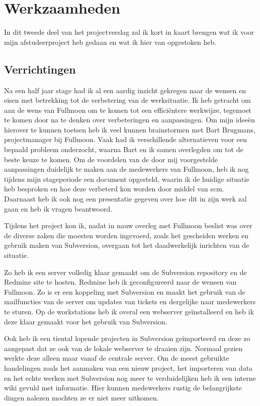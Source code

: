 \chapter{Werkzaamheden}

In dit tweede deel van het projectverslag zal ik kort in kaart brengen wat ik voor mijn afstudeerproject heb gedaan en wat ik hier van opgestoken heb.

\section{Verrichtingen}

Na een half jaar stage had ik al een aardig inzicht gekregen naar de wensen en eisen met betrekking tot de verbetering van de werksituatie. Ik heb getracht om aan de wens van Fullmoon om te komen tot een efficiëntere werkwijze, tegemoet te komen door na te denken over verbeteringen en aanpassingen. Om mijn ideeën hierover te kunnen toetsen heb ik veel kunnen brainstormen met Bart Brugmans, projectmanager bij Fullmoon. Vaak had ik verschillende alternatieven voor een bepaald probleem onderzocht, waarna Bart en ik samen overlegden om tot de beste keuze te komen. Om de voordelen van de door mij voorgestelde aanpassingen duidelijk te maken aan de medewerkers van Fullmoon, heb ik nog tijdens mijn stageperiode een document opgesteld, waarin ik de huidige situatie heb besproken en hoe deze verbeterd kon worden door middel van {\sc scm}. Daarnaast heb ik ook nog een presentatie gegeven over hoe dit in zijn werk zal gaan en heb ik vragen beantwoord. 

Tijdens het project kon ik, nadat in nauw overleg met Fullmoon beslist was over de diverse zaken die moesten worden ingevoerd, zoals het gescheiden werken en gebruik maken van Subversion, overgaan tot het daadwerkelijk inrichten van de situatie.

Zo heb ik een server volledig klaar gemaakt om de Subversion repository en de Redmine site te hosten. Redmine heb ik geconfigureerd naar de wensen van Fullmoon. Zo is er een koppeling met Subversion en maakt het gebruik van de mailfuncties van de server om updates van tickets en dergelijke naar medewerkers te sturen. Op de workstations heb ik overal een webserver geïnstalleerd en heb ik deze klaar gemaakt voor het gebruik van Subversion.

Ook heb ik een tiental lopende projecten in Subversion geïmporteerd en deze zo aangepast dat ze ook van de lokale webserver te draaien zijn. Normaal gezien werkte deze alleen maar vanaf de centrale server. Om de meest gebruikte handelingen zoals het aanmaken van een nieuw project, het importeren van data en het echte werken met Subversion nog meer te verduidelijken heb ik een interne wiki gevuld met informatie. Hier kunnen medewerkers rustig de belangrijkste dingen nalezen mochten ze er niet meer uitkomen.

